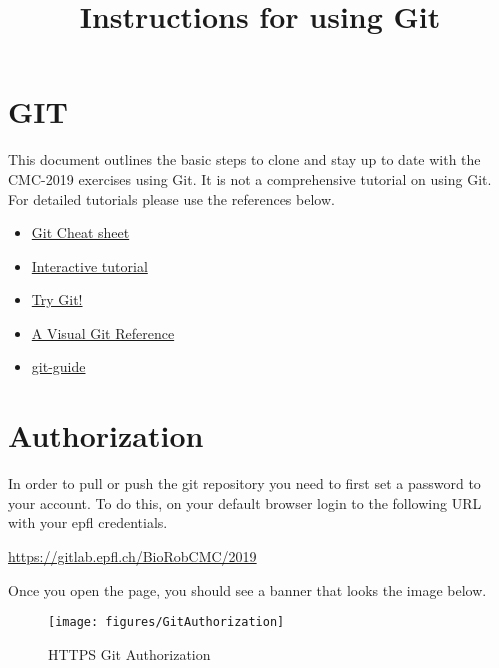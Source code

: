 \documentclass{cmc}
\title{Instructions for using Git}
\begin{document}
\maketitle
\tableofcontents
\pagestyle{fancy}
 

\newpage

\section{GIT}
\label{sec:git}

This document outlines the basic steps to clone and stay up to date
with the CMC-2019 exercises using Git. It is not a comprehensive
tutorial on using Git. For detailed tutorials please use the
references below.

\begin{itemize}
\item \href{http://ndpsoftware.com/git-cheatsheet.html}{Git
    Cheat sheet}
\item \href{https://learngitbranching.js.org}{Interactive tutorial}
\item \href{https://try.github.io/levels/1/challenges/1}{Try Git!}
\item
  \href{https://marklodato.github.io/visual-git-guide/index-en.html}{A
    Visual Git Reference}
\item \href{http://rogerdudler.github.io/git-guide/}{git-guide}
\end{itemize}


\section{Authorization}
In order to pull or push the git repository you need to first set a
password to your account.  To do this, on your default browser login
to the following URL with your epfl credentials.

\url{https://gitlab.epfl.ch/BioRobCMC/2019}

Once you open the page, you should see a banner that looks the image
below.

\begin{figure}[h]
  \centering \texttt{[image: figures/GitAuthorization]}
  \caption{HTTPS Git Authorization}
  \label{fig:authorization}
\end{figure}
\end{document}
